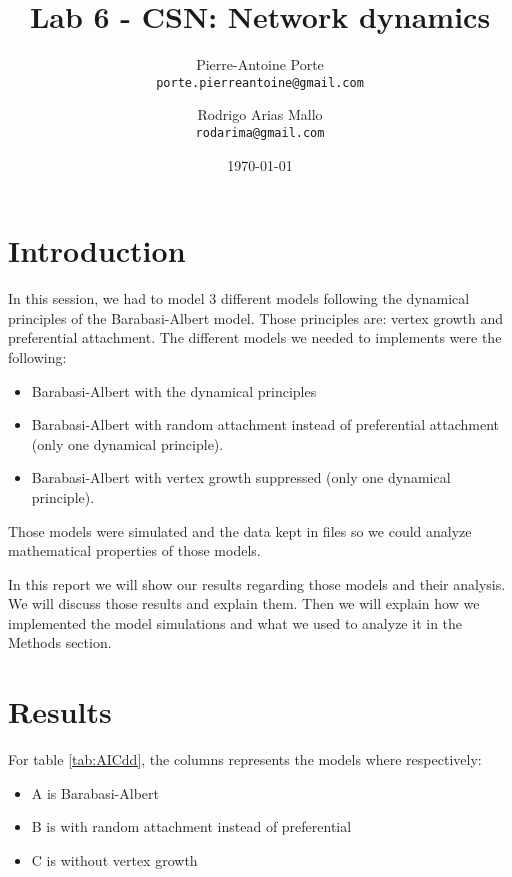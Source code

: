 \documentclass{article}
\title{Lab 6 - CSN: Network dynamics}
\author{Pierre-Antoine Porte \\ \texttt{porte.pierreantoine@gmail.com}
\and Rodrigo Arias Mallo \\ \texttt{rodarima@gmail.com}}
\date{\today}
\begin{document}
\maketitle

\section{Introduction}

In this session, we had to model 3 different models following the dynamical
principles of the Barabasi-Albert model. Those principles are: vertex growth and
preferential attachment. The different models we needed to implements were the
following:

\begin{itemize}
	\item Barabasi-Albert with the dynamical principles
	\item Barabasi-Albert with random attachment instead of preferential
	attachment (only one dynamical principle).
	\item Barabasi-Albert with vertex growth suppressed (only one dynamical
	principle).
\end{itemize}

Those models were simulated and the data kept in files so we could analyze
mathematical properties of those models.

In this report we will show our results regarding those models and their
analysis. We will discuss those results and explain them. Then we will explain
how we implemented the model simulations and what we used to analyze it in the
Methods section.

\section{Results}

For table \ref{tab:AICdd}, the columns represents the models where respectively:

\begin{itemize}
		\item A is Barabasi-Albert
		\item B is with random attachment instead of preferential
		\item C is without vertex growth
\end{itemize}

\end{document}
